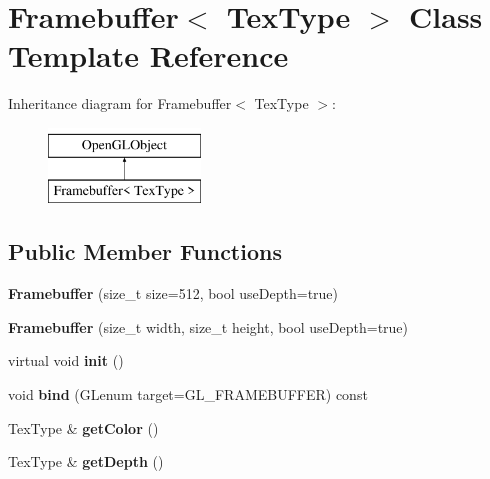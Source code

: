 \hypertarget{class_framebuffer}{\section{Framebuffer$<$ Tex\+Type $>$ Class Template Reference}
\label{class_framebuffer}
}
Inheritance diagram for Framebuffer$<$ Tex\+Type $>$\+:\begin{figure}[H]
\begin{center}
\leavevmode
\includegraphics[height=2.000000cm]{class_framebuffer}
\end{center}
\end{figure}
\subsection*{Public Member Functions}
\begin{DoxyCompactItemize}
\item 
\hypertarget{class_framebuffer_af1dca358cc28fcd088cddec942c06f81}{{\bfseries Framebuffer} (size\+\_\+t size=512, bool use\+Depth=true)}\label{class_framebuffer_af1dca358cc28fcd088cddec942c06f81}

\item 
\hypertarget{class_framebuffer_a2c7588cabdab14126f3979a1eb6bc0a4}{{\bfseries Framebuffer} (size\+\_\+t width, size\+\_\+t height, bool use\+Depth=true)}\label{class_framebuffer_a2c7588cabdab14126f3979a1eb6bc0a4}

\item 
\hypertarget{class_framebuffer_aba8bd86011c1d69e71a5484385e25612}{virtual void {\bfseries init} ()}\label{class_framebuffer_aba8bd86011c1d69e71a5484385e25612}

\item 
\hypertarget{class_framebuffer_a2d5e250c6cf94ccd1347451388711851}{void {\bfseries bind} (G\+Lenum target=G\+L\+\_\+\+F\+R\+A\+M\+E\+B\+U\+F\+F\+E\+R) const }\label{class_framebuffer_a2d5e250c6cf94ccd1347451388711851}

\item 
\hypertarget{class_framebuffer_a8eb942266a2b5fb870b0d938d87141b2}{Tex\+Type \& {\bfseries get\+Color} ()}\label{class_framebuffer_a8eb942266a2b5fb870b0d938d87141b2}

\item 
\hypertarget{class_framebuffer_aa617cd6ac95905c23636d42439e6191b}{Tex\+Type \& {\bfseries get\+Depth} ()}\label{class_framebuffer_aa617cd6ac95905c23636d42439e6191b}

\end{DoxyCompactItemize}
